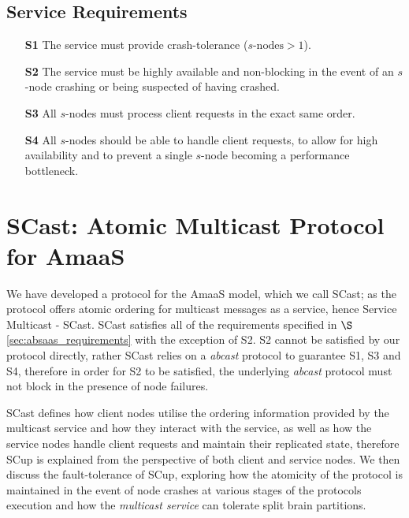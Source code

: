     \subsection*{Service Requirements}
	\begin{itemize}
		\item [\textbf{S1}] The service must provide crash-tolerance ($s\text{-nodes} > 1$).
		
		\item [\textbf{S2}] The service must be highly available and non-blocking in the event of an $s$-node crashing or being suspected of having crashed.  
				
		\item [\textbf{S3}] All $s$-nodes must process client requests in the exact same order.
		
		\item [\textbf{S4}] All $s$-nodes should be able to handle client requests, to allow for high availability and to prevent a single $s$-node becoming a performance bottleneck.
	\end{itemize}

\section{SCast: Atomic Multicast Protocol for AmaaS}\label{sec:scast_protocol}
We have developed a protocol for the \textsf{AmaaS} model, which we call \textsf{SCast}; as the protocol offers atomic ordering for multicast messages as a service, hence Service Multicast - \textsf{SCast}.  \textsf{SCast} satisfies all of the requirements specified in $\S$ \ref{sec:absaas_requirements} with the exception of S2.  S2 cannot be satisfied by our protocol directly, rather \textsf{SCast} relies on a \emph{abcast} protocol to guarantee S1, S3 and S4, therefore in order for S2 to be satisfied, the underlying \emph{abcast} protocol must not block in the presence of node failures.  

\textsf{SCast} defines how client nodes utilise the ordering information provided by the multicast service and how they interact with the service, as well as how the service nodes handle client requests and maintain their replicated state, therefore \textsf{SCup} is explained from the perspective of both client and service nodes.  We then discuss the fault-tolerance of \textsf{SCup}, exploring how the atomicity of the protocol is maintained in the event of node crashes at various stages of the protocols execution and how the \emph{multicast service} can tolerate split brain partitions.  

